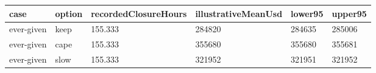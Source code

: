 \begin{tabular}{llllll}
\toprule
case & option & recordedClosureHours & illustrativeMeanUsd & lower95 & upper95 \\
\midrule
ever-given & keep & 155.333 & 284820 & 284635 & 285006 \\
ever-given & cape & 155.333 & 355680 & 355680 & 355681 \\
ever-given & slow & 155.333 & 321952 & 321951 & 321952 \\
\bottomrule
\end{tabular}
